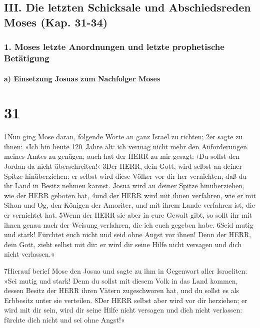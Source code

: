 \hypertarget{iii.-die-letzten-schicksale-und-abschiedsreden-moses-kap.-31-34}{%
\subsection{III. Die letzten Schicksale und Abschiedsreden Moses (Kap.
31-34)}\label{iii.-die-letzten-schicksale-und-abschiedsreden-moses-kap.-31-34}}

\hypertarget{moses-letzte-anordnungen-und-letzte-prophetische-betuxe4tigung}{%
\subsubsection{1. Moses letzte Anordnungen und letzte prophetische
Betätigung}\label{moses-letzte-anordnungen-und-letzte-prophetische-betuxe4tigung}}

\hypertarget{a-einsetzung-josuas-zum-nachfolger-moses}{%
\paragraph{a) Einsetzung Josuas zum Nachfolger
Moses}\label{a-einsetzung-josuas-zum-nachfolger-moses}}

\hypertarget{section-30}{%
\section{31}\label{section-30}}

1Nun ging Mose daran, folgende Worte an ganz Israel zu richten; 2er
sagte zu ihnen: »Ich bin heute 120~Jahre alt: ich vermag nicht mehr den
Anforderungen meines Amtes zu genügen; auch hat der HERR zu mir gesagt:
›Du sollst den Jordan da nicht überschreiten!‹ 3Der HERR, dein Gott,
wird selbst an deiner Spitze hinüberziehen: er selbst wird diese Völker
vor dir her vernichten, daß du ihr Land in Besitz nehmen kannst. Josua
wird an deiner Spitze hinüberziehen, wie der HERR geboten hat, 4und der
HERR wird mit ihnen verfahren, wie er mit Sihon und Og, den Königen der
Amoriter, und mit ihrem Lande verfahren ist, die er vernichtet hat.
5Wenn der HERR sie aber in eure Gewalt gibt, so sollt ihr mit ihnen
genau nach der Weisung verfahren, die ich euch gegeben habe. 6Seid mutig
und stark! Fürchtet euch nicht und seid ohne Angst vor ihnen! Denn der
HERR, dein Gott, zieht selbst mit dir: er wird dir seine Hilfe nicht
versagen und dich nicht verlassen.«

7Hierauf berief Mose den Josua und sagte zu ihm in Gegenwart aller
Israeliten: »Sei mutig und stark! Denn du sollst mit diesem Volk in das
Land kommen, dessen Besitz der HERR ihren Vätern zugeschworen hat, und
du sollst es als Erbbesitz unter sie verteilen. 8Der HERR selbst aber
wird vor dir herziehen; er wird mit dir sein, wird dir seine Hilfe nicht
versagen und dich nicht verlassen: fürchte dich nicht und sei ohne
Angst!«


